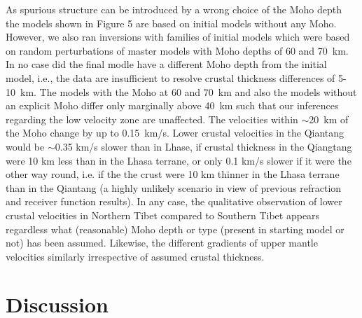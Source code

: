 \documentclass[12pt]{article}
\begin{document}
As spurious structure can be introduced by a wrong choice of the
Moho depth the models shown in Figure 5 are based on initial models
without any Moho.  However, we also ran inversions with families of
initial models which were based on random perturbations of master
models with Moho depths of 60 and 70~km.  In no case did the final
modle have a different Moho depth from the initial model, i.e., the
data are insufficient to resolve crustal thickness differences of
5-10~km.  The models with the Moho at 60 and 70~km and also the models
without an explicit Moho differ only marginally above 40~km such that
our inferences regarding the low velocity zone are unaffected.  The
velocities within $\sim$20~km of the Moho change by up to 0.15~km/s.
Lower crustal velocities in the Qiantang would be $\sim$0.35 km/s
slower than in Lhase, if crustal thickness in the Qiangtang were 10 km
less than in the Lhasa terrane, or only 0.1 km/s slower if it were the
other way round, i.e. if the the crust were 10 km thinner in the Lhasa
terrane than in the Qiantang (a highly unlikely scenario in view of
previous refraction and receiver function results).  In any case, the
qualitative observation of lower crustal velocities in Northern Tibet
compared to Southern Tibet appears regardless what (reasonable) Moho
depth or type (present in starting model or not) has been assumed.  Likewise, the different gradients of upper mantle velocities similarly irrespective of assumed crustal thickness.

\section{Discussion} 
\end{document}
